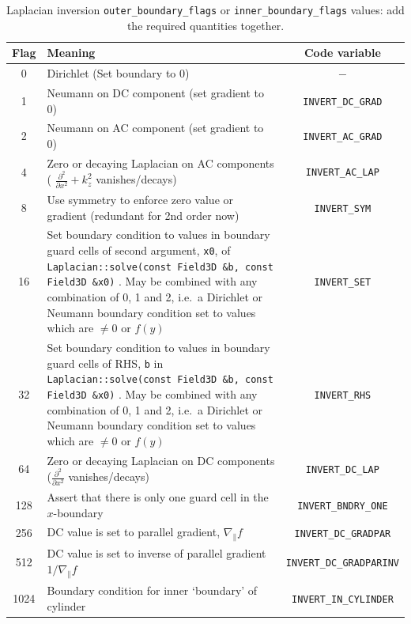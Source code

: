 \documentclass[12pt]{article}
\newcommand{\code}[1]{\texttt{#1}}
\begin{document}
\begin{table}
\caption{Laplacian inversion \code{outer\_boundary\_flags} or
\code{inner\_boundary\_flags} values: add the required quantities together.}
%
\label{tab:laplaceBCflags}
%
\centering
%
\begin{tabular}[c]{c|p{10cm}|c}
    \hline
    Flag & Meaning & Code variable\\
     &
    Dirichlet (Set boundary to 0) &
    $-$
    \\
    1 &
    Neumann on DC component (set gradient to 0) &
    \code{INVERT\_DC\_GRAD}
    \\
    2 &
    Neumann on AC component (set gradient to 0) &
    \code{INVERT\_AC\_GRAD}
    \\
    4 &
    Zero or decaying Laplacian on AC components ( $\frac{\partial^2}{\partial
    x^2}+k_z^2$ vanishes/decays) &
    \code{INVERT\_AC\_LAP}
    \\
    8 &
    Use symmetry to enforce zero value or gradient (redundant for 2nd order
    now) &
    \code{INVERT\_SYM}
    \\
    16 &
    Set boundary condition to values in boundary guard cells of second
    argument, \code{x0}, of
\lstinline!Laplacian::solve(const Field3D &b, const Field3D &x0)!
%
    .  May be combined with any combination of 0, 1 and 2, i.e.\ a Dirichlet or
    Neumann boundary condition set to values which are $\neq 0$ or $f(y)$ &
    \code{INVERT\_SET}
    \\
    32 &
    Set boundary condition to values in boundary guard cells of RHS, \code{b}
    in
\lstinline!Laplacian::solve(const Field3D &b, const Field3D &x0)!
%
    .  May be combined with any combination of 0, 1 and 2, i.e.\ a Dirichlet or
    Neumann boundary condition set to values which are $\neq 0$ or $f(y)$ &
    \code{INVERT\_RHS}
    \\
    64 &
    Zero or decaying Laplacian on DC components ($\frac{\partial^2}{\partial
    x^2}$ vanishes/decays) &
    \code{INVERT\_DC\_LAP}
    \\
    128 &
    Assert that there is only one guard cell in the $x$-boundary &
    \code{INVERT\_BNDRY\_ONE}
    \\
    256 &
    DC value is set to parallel gradient, $\nabla_\parallel f$ &
    \code{INVERT\_DC\_GRADPAR}
    \\
    512 &
    DC value is set to inverse of parallel gradient $1/\nabla_\parallel f$ &
    \code{INVERT\_DC\_GRADPARINV}
    \\
    1024 &
    Boundary condition for inner `boundary' of cylinder &
    \code{INVERT\_IN\_CYLINDER}
    \\
    \hline
\end{tabular}
%
\end{table}
\end{document}
